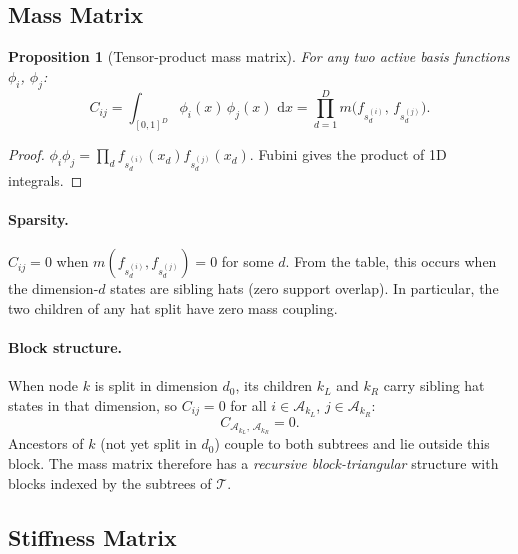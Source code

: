 \documentclass[11pt]{article}
\newtheorem{proposition}{Proposition}
\newcommand{\dd}{\,\mathrm{d}}
\begin{document}
\subsection{Mass Matrix}
\label{sec:hat-mass}

\begin{proposition}[Tensor-product mass matrix]
\label{prop:mass-new}
For any two active basis functions $\phi_i$, $\phi_j$:
\begin{equation}
  C_{ij} = \int_{[0,1]^D} \phi_i(x)\,\phi_j(x)\,\dd x
          = \prod_{d=1}^D m\!\bigl(f_{s_d^{(i)}},\, f_{s_d^{(j)}}\bigr).
  \label{eq:hat-mass-new}
\end{equation}
\end{proposition}
\begin{proof}
$\phi_i\phi_j = \prod_d f_{s_d^{(i)}}(x_d)f_{s_d^{(j)}}(x_d)$.
Fubini gives the product of 1D integrals.
\end{proof}

\paragraph{Sparsity.}
$C_{ij} = 0$ when $m(f_{s_d^{(i)}},f_{s_d^{(j)}})=0$ for some $d$.
From the table, this occurs when the dimension-$d$ states are sibling hats
(zero support overlap).  In particular, the two children of any hat split
have zero mass coupling.

\paragraph{Block structure.}
When node $k$ is split in dimension $d_0$, its children $k_L$ and $k_R$
carry sibling hat states in that dimension, so $C_{ij} = 0$ for all
$i\in\mathcal{A}_{k_L}$, $j\in\mathcal{A}_{k_R}$:
\begin{equation}
  C_{\mathcal{A}_{k_L},\,\mathcal{A}_{k_R}} = 0.
  \label{eq:C-block-zero}
\end{equation}
Ancestors of $k$ (not yet split in $d_0$) couple to both subtrees and lie
outside this block.  The mass matrix therefore has a \emph{recursive
block-triangular} structure with blocks indexed by the subtrees of $\mathcal{T}$.

\subsection{Stiffness Matrix}
\label{sec:hat-stiffness}
\end{document}
